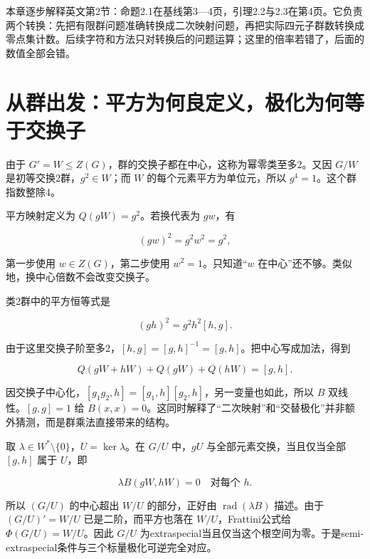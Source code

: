 \documentclass[UTF8,fontset=fandol,zihao=-4,openany,oneside]{ctexbook}
\begin{document}
本章逐步解释英文第2节：命题2.1在基线第3—4页，引理2.2与2.3在第4页。它负责两个转换：先把有限群问题准确转换成二次映射问题，再把实际四元子群数转换成零点集计数。后续字符和方法只对转换后的问题运算；这里的倍率若错了，后面的数值全部会错。



\section{从群出发：平方为何良定义，极化为何等于交换子}


由于 \(G'=W\le Z(G)\)，群的交换子都在中心，这称为幂零类至多2。又因 \(G/W\) 是初等交换2群，\(g^2\in W\)；而 \(W\) 的每个元素平方为单位元，所以 \(g^4=1\)。这个群指数整除4。



平方映射定义为 \(Q(gW)=g^2\)。若换代表为 \(gw\)，有



\[
(gw)^2=g^2w^2=g^2,
\]



第一步使用 \(w\in Z(G)\)，第二步使用 \(w^2=1\)。只知道“\(w\) 在中心”还不够。类似地，换中心倍数不会改变交换子。



类2群中的平方恒等式是



\[
(gh)^2=g^2h^2[h,g].
\]



由于这里交换子阶至多2，\([h,g]=[g,h]^{-1}=[g,h]\)。把中心写成加法，得到



\[
Q(gW+hW)+Q(gW)+Q(hW)=[g,h].
\]



因交换子中心化，\([g_1g_2,h]=[g_1,h][g_2,h]\)，另一变量也如此，所以 \(B\) 双线性。\([g,g]=1\) 给 \(B(x,x)=0\)。这同时解释了“二次映射”和“交替极化”并非额外猜测，而是群乘法直接带来的结构。



取 \(\lambda\in W^*\setminus\{0\}\)，\(U=\ker\lambda\)。在 \(G/U\) 中，\(gU\) 与全部元素交换，当且仅当全部 \([g,h]\) 属于 \(U\)，即



\[
\lambda B(gW,hW)=0\quad\text{对每个 }h.
\]



所以 \((G/U)\) 的中心超出 \(W/U\) 的部分，正好由 \(\operatorname{rad}(\lambda B)\) 描述。由于 \((G/U)'=W/U\) 已是二阶，而平方也落在 \(W/U\)，Frattini公式给 \(\Phi(G/U)=W/U\)。因此 \(G/U\) 为extraspecial当且仅当这个根空间为零。于是semi-extraspecial条件与三个标量极化可逆完全对应。
\end{document}
